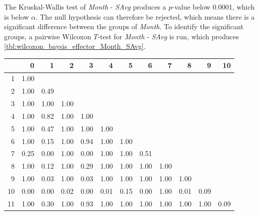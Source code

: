 The Kruskal-Wallis test of \textit{Month} - \textit{SAvg} produces a $p$-value below 0.0001, which is below $\alpha$. The null hypothesis can therefore be rejected, which means there is a significant difference between the groups of \textit{Month}. To identify the significant groups, a pairwise Wilcoxon $T$-test for \textit{Month} - \textit{SAvg} is run, which produces \cref{tbl:wilcoxon_baysis_effector_Month_SAvg}. 
% 
\begin{tabular}{rrrrrrrrrrrr}
  \hline
 & 0 & 1 & 2 & 3 & 4 & 5 & 6 & 7 & 8 & 9 & 10 \\ 
  \hline
1 & 1.00 &  &  &  &  &  &  &  &  &  &  \\ 
  2 & 1.00 & 0.49 &  &  &  &  &  &  &  &  &  \\ 
  3 & 1.00 & 1.00 & 1.00 &  &  &  &  &  &  &  &  \\ 
  4 & 1.00 & 0.82 & 1.00 & 1.00 &  &  &  &  &  &  &  \\ 
  5 & 1.00 & 0.47 & 1.00 & 1.00 & 1.00 &  &  &  &  &  &  \\ 
  6 & 1.00 & 0.15 & 1.00 & 0.94 & 1.00 & 1.00 &  &  &  &  &  \\ 
  7 & 0.25 & 0.00 & 1.00 & 0.00 & 1.00 & 1.00 & 0.51 &  &  &  &  \\ 
  8 & 1.00 & 0.12 & 1.00 & 0.29 & 1.00 & 1.00 & 1.00 & 1.00 &  &  &  \\ 
  9 & 1.00 & 0.03 & 1.00 & 0.03 & 1.00 & 1.00 & 1.00 & 1.00 & 1.00 &  &  \\ 
  10 & 0.00 & 0.00 & 0.02 & 0.00 & 0.01 & 0.15 & 0.00 & 1.00 & 0.01 & 0.09 &  \\ 
  11 & 1.00 & 0.30 & 1.00 & 0.93 & 1.00 & 1.00 & 1.00 & 1.00 & 1.00 & 1.00 & 0.09 \\ 
   \hline
\end{tabular}
% 
